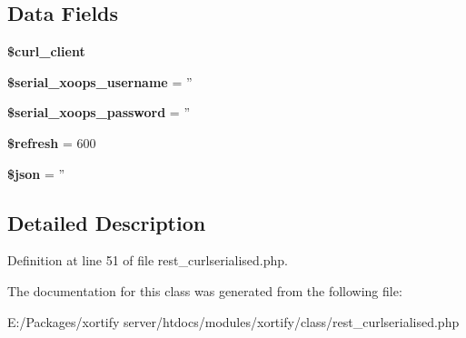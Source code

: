 \subsection*{Data Fields}
\begin{DoxyCompactItemize}
\item 
\hypertarget{class_r_e_s_t___c_u_r_l_s_e_r_i_a_l_i_s_e_d_xortify_exchange_a402f2112991f3227835af80e9df33e38}{{\bfseries \$curl\-\_\-client}}\label{class_r_e_s_t___c_u_r_l_s_e_r_i_a_l_i_s_e_d_xortify_exchange_a402f2112991f3227835af80e9df33e38}

\item 
\hypertarget{class_r_e_s_t___c_u_r_l_s_e_r_i_a_l_i_s_e_d_xortify_exchange_a276a5744b88de586eb05b0dce0f6873d}{{\bfseries \$serial\-\_\-xoops\-\_\-username} = ''}\label{class_r_e_s_t___c_u_r_l_s_e_r_i_a_l_i_s_e_d_xortify_exchange_a276a5744b88de586eb05b0dce0f6873d}

\item 
\hypertarget{class_r_e_s_t___c_u_r_l_s_e_r_i_a_l_i_s_e_d_xortify_exchange_a7ac0fbf96eb048ccec682ee45eb3df00}{{\bfseries \$serial\-\_\-xoops\-\_\-password} = ''}\label{class_r_e_s_t___c_u_r_l_s_e_r_i_a_l_i_s_e_d_xortify_exchange_a7ac0fbf96eb048ccec682ee45eb3df00}

\item 
\hypertarget{class_r_e_s_t___c_u_r_l_s_e_r_i_a_l_i_s_e_d_xortify_exchange_a8527f826b6959aaa92b0e51ee427ba1a}{{\bfseries \$refresh} = 600}\label{class_r_e_s_t___c_u_r_l_s_e_r_i_a_l_i_s_e_d_xortify_exchange_a8527f826b6959aaa92b0e51ee427ba1a}

\item 
\hypertarget{class_r_e_s_t___c_u_r_l_s_e_r_i_a_l_i_s_e_d_xortify_exchange_acedd13b51401130848ce18f4d5c52605}{{\bfseries \$json} = ''}\label{class_r_e_s_t___c_u_r_l_s_e_r_i_a_l_i_s_e_d_xortify_exchange_acedd13b51401130848ce18f4d5c52605}

\end{DoxyCompactItemize}


\subsection{Detailed Description}


Definition at line 51 of file rest\-\_\-curlserialised.\-php.



The documentation for this class was generated from the following file\-:\begin{DoxyCompactItemize}
\item 
E\-:/\-Packages/xortify server/htdocs/modules/xortify/class/rest\-\_\-curlserialised.\-php\end{DoxyCompactItemize}
